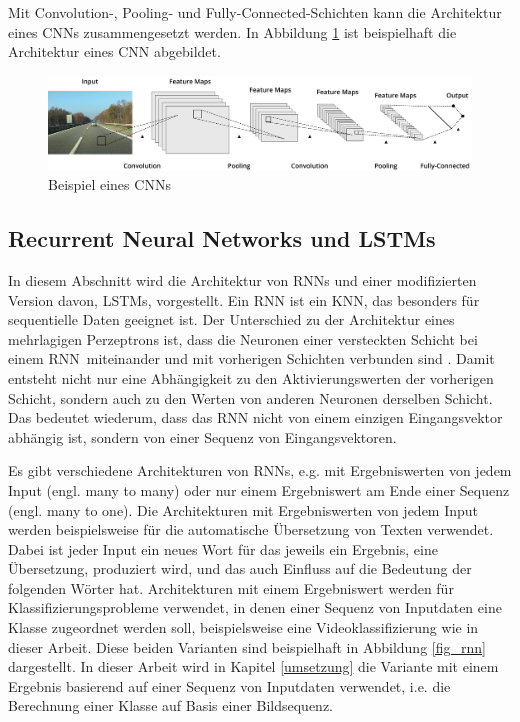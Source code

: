 Mit Convolution-, Pooling- und Fully-Connected-Schichten kann die Architektur eines \acp{CNN} zusammengesetzt werden. In Abbildung \ref{fig_cnn} ist beispielhaft die Architektur eines \ac{CNN} abgebildet.


\begin{figure}[h]
\centering
\includegraphics[scale=0.2]{images/cnn.pdf}
\caption{Beispiel eines \aclp{CNN}}
\label{fig_cnn}
\end{figure}


\subsection{Recurrent Neural Networks und LSTMs}
\label{grundlagen_nn_rnn}

In diesem Abschnitt wird die Architektur von \acfp{RNN} und einer modifizierten Version davon, \acfp{LSTM}, vorgestellt. Ein \ac{RNN} ist ein \ac{KNN}, das besonders für sequentielle Daten geeignet ist. Der Unterschied zu der Architektur eines mehrlagigen Perzeptrons ist, dass die Neuronen einer versteckten Schicht bei einem \ac{RNN} miteinander und mit vorherigen Schichten verbunden sind \cite{graves2012rnn}. Damit entsteht nicht nur eine Abhängigkeit zu den Aktivierungswerten der vorherigen Schicht, sondern auch zu den Werten von anderen Neuronen derselben Schicht. Das bedeutet wiederum, dass das \ac{RNN} nicht von einem einzigen Eingangsvektor abhängig ist, sondern von einer Sequenz von Eingangsvektoren. 

Es gibt verschiedene Architekturen von \acp{RNN}, e.g. mit Ergebniswerten von jedem Input (engl. many to many) oder nur einem Ergebniswert am Ende einer Sequenz (engl. many to one). Die Architekturen mit Ergebniswerten von jedem Input werden beispielsweise für die automatische Übersetzung von Texten verwendet. Dabei ist jeder Input ein neues Wort für das jeweils ein Ergebnis, eine Übersetzung, produziert wird, und das auch Einfluss auf die Bedeutung der folgenden Wörter hat. Architekturen mit einem Ergebniswert werden für Klassifizierungsprobleme verwendet, in denen einer Sequenz von Inputdaten eine Klasse zugeordnet werden soll, beispielsweise eine Videoklassifizierung wie in dieser Arbeit. Diese beiden Varianten sind beispielhaft in Abbildung \ref{fig_rnn} dargestellt. In dieser Arbeit wird in Kapitel \ref{umsetzung} die Variante mit einem Ergebnis basierend auf einer Sequenz von Inputdaten verwendet, i.e. die Berechnung einer Klasse auf Basis einer Bildsequenz.

